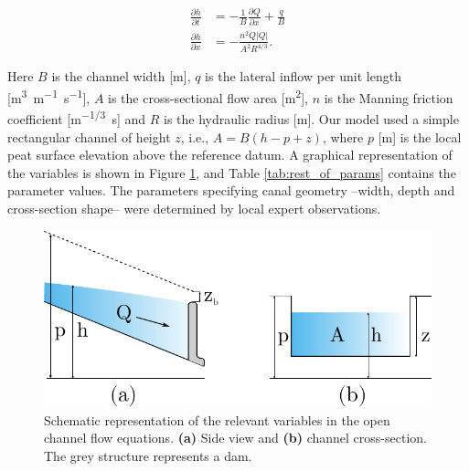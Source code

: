 \documentclass[bg, manuscript]{copernicus}
\begin{document}


\begin{align}
    \frac{\partial h}{\partial t} & = -\frac{1}{B}\frac{\partial Q}{\partial x} + \frac{q}{B} \label{eq:diff-wave-mass}\\
    \frac{\partial h}{\partial x}  & = - \frac{n^2 Q |Q|}{A^2 R^{4/3}}. \label{eq:diff-wave-momentum}
\end{align}

Here $B$ is the channel width [\unit{m}], $q$ is the lateral inflow per unit length [\unit{m^3m^{-1}s^{-1}}], $A$ is the cross-sectional flow area [\unit{m^2}], $n$ is the Manning friction coefficient [\unit{m^{-1/3}s}] and $R$ is the hydraulic radius [\unit{m}].
Our model used a simple rectangular channel of height $z$, i.e., $A = B(h-p+z)$, where $p$ [\unit{m}] is the local peat surface elevation above the reference datum.
A graphical representation of the variables is shown in Figure \ref{fig:schema_SVE}, and Table \ref{tab:rest_of_params} contains the parameter values.
The  parameters specifying canal geometry --width, depth and cross-section shape-- were determined by local expert observations.

\begin{figure}[H]
\includegraphics[width=8.3 cm]{figs/canal_alboko_goitiko_bistak.pdf}
\caption{Schematic representation of the relevant variables in the open channel flow equations. \textbf{(a)} Side view and \textbf{(b)} channel cross-section. The grey structure represents a dam.}
\label{fig:schema_SVE}
\end{figure}  
\end{document}
